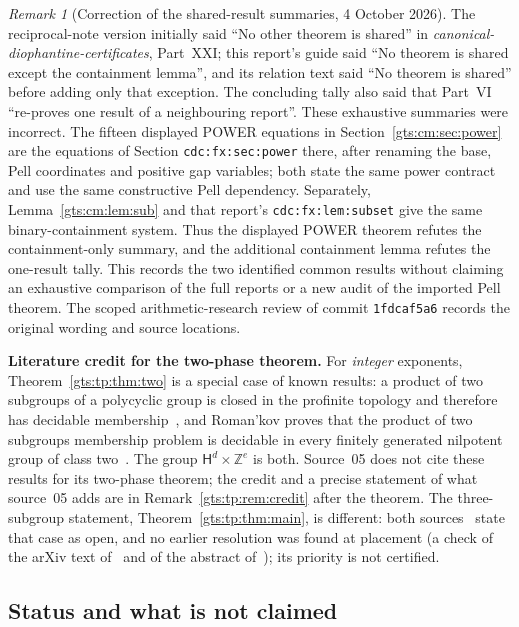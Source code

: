 \documentclass[11pt,letterpaper]{article}
\theoremstyle{definition}
\theoremstyle{remark}
\newtheorem{remark}[theorem]{Remark}
\newcommand{\Z}{\mathbb Z}
\newcommand{\HH}{\mathsf H}
\begin{document}
\begin{remark}[Correction of the shared-result summaries, 4 October 2026]
\label{gts:rem:shared-power-containment-correction}
The reciprocal-note version initially said ``No other theorem is shared''
in \emph{canonical-diophantine-certificates}, Part~XXI; this report's guide
said ``No theorem is shared except the containment lemma'', and its
relation text said ``No theorem is shared'' before adding only that exception.
The concluding tally also said that Part~VI ``re-proves one result of a
neighbouring report''. These exhaustive summaries were incorrect.
The fifteen displayed POWER equations in Section~\ref{gts:cm:sec:power}
are the equations of Section \texttt{cdc:fx:sec:power} there, after renaming
the base, Pell coordinates and positive gap variables; both state the
same power contract and use the same constructive Pell dependency.
Separately, Lemma~\ref{gts:cm:lem:sub} and that report's
\texttt{cdc:fx:lem:subset} give the same binary-containment system.
Thus the displayed POWER theorem refutes the containment-only summary,
and the additional containment lemma refutes the one-result tally.
This records the two identified common results without claiming an
exhaustive comparison of the full reports or a new audit of the imported
Pell theorem. The scoped arithmetic-research review of commit
\texttt{1fdcaf5a6} records the original wording and source locations.
\end{remark}

\textbf{Literature credit for the two-phase theorem.} For \emph{integer} exponents, Theorem~\ref{gts:tp:thm:two} is a special case of known results: a product of two subgroups of a polycyclic group is closed in the profinite topology and therefore has decidable membership~\cite[Remark~6.7]{KLZ}, and Roman'kov proves that the product of two subgroups membership problem is decidable in every finitely generated nilpotent group of class two~\cite{Romankov}. The group $\HH^d\times\Z^e$ is both. Source~05 does not cite these results for its two-phase theorem; the credit and a precise statement of what source~05 adds are in Remark~\ref{gts:tp:rem:credit} after the theorem. The three-subgroup statement, Theorem~\ref{gts:tp:thm:main}, is different: both sources~\cite{KLZ,Romankov} state that case as open, and no earlier resolution was found at placement (a check of the arXiv text of~\cite{KLZ} and of the abstract of~\cite{Romankov}); its priority is not certified.

\subsection{Status and what is not claimed}\label{gts:sec:status}
\end{document}
